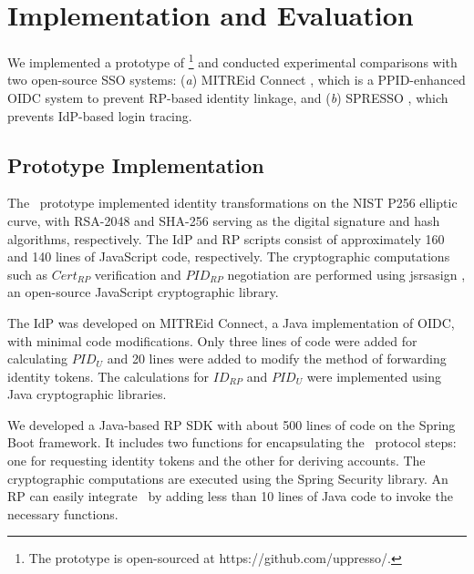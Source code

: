\section{Implementation and Evaluation}
\label{sec:implementation}

We implemented a prototype of \usso\footnote{The prototype is open-sourced at https://github.com/uppresso/.} and conducted experimental comparisons with two open-source SSO systems: (\emph{a}) MITREid Connect \cite{MITREid}, which is a PPID-enhanced OIDC system to prevent RP-based identity linkage, and (\emph{b}) SPRESSO \cite{SPRESSO}, which prevents IdP-based login tracing.


\subsection{Prototype Implementation}
\label{subsec:proto-imple}

The \usso\ prototype implemented identity transformations on the NIST P256 elliptic curve, with RSA-2048 and SHA-256 serving as the digital signature and hash algorithms, respectively. The IdP and RP scripts consist of approximately 160 and 140 lines of JavaScript code, respectively.  %
The cryptographic computations such as $Cert_{RP}$ verification and $PID_{RP}$ negotiation are performed using jsrsasign \cite{jsrsasign}, an open-source JavaScript cryptographic library.

The IdP was developed on MITREid Connect\cite{MITREid}, a Java implementation of OIDC, %
with minimal code modifications. Only three lines of code were added for calculating $PID_U$ and 20 lines were added to modify the method of forwarding identity tokens.
The calculations for $ID_{RP}$ and $PID_U$ were implemented using Java cryptographic libraries.

We developed a Java-based RP SDK with about 500 lines of code on the Spring Boot framework. It includes two functions for encapsulating the \usso\ protocol steps: one for requesting identity tokens and the other for deriving accounts. The cryptographic computations are executed using the Spring Security library.
An RP can easily integrate \usso\ by  adding less than 10 lines of Java code to invoke the necessary functions.
